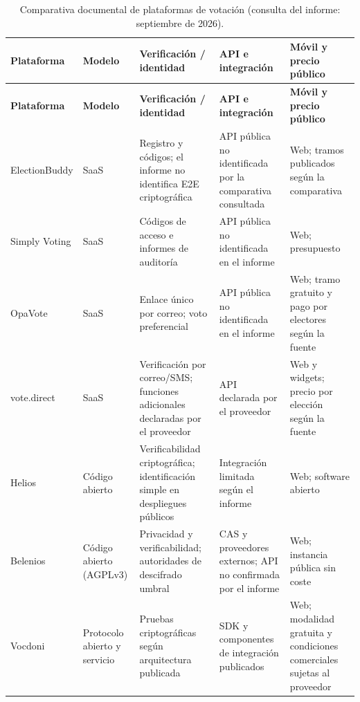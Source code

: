 \small
\setlength{\tabcolsep}{3pt}
\begin{longtable}{|p{}|p{}|p{}|p{}|p{}|}
\caption{Comparativa documental de plataformas de votación (consulta del informe: septiembre de 2026).}\label{tab:comparativa-plataformas}\\
\hline
\textbf{Plataforma} & \textbf{Modelo} & \textbf{Verificación / identidad} & \textbf{API e integración} & \textbf{Móvil y precio público} \\
\hline
\endfirsthead
\hline
\textbf{Plataforma} & \textbf{Modelo} & \textbf{Verificación / identidad} & \textbf{API e integración} & \textbf{Móvil y precio público} \\
\hline
\endhead
\hline
\endfoot
\hline
\endlastfoot
ElectionBuddy \citep{electionbuddy2026} & SaaS & Registro y códigos; el informe no identifica E2E criptográfica & API pública no identificada por la comparativa consultada & Web; tramos publicados según la comparativa \\
\hline
Simply Voting \citep{simplyvoting2026} & SaaS & Códigos de acceso e informes de auditoría & API pública no identificada en el informe & Web; presupuesto \\
\hline
OpaVote \citep{opavote2026} & SaaS & Enlace único por correo; voto preferencial & API pública no identificada en el informe & Web; tramo gratuito y pago por electores según la fuente \\
\hline
vote.direct \citep{votedirect2026comparativa} & SaaS & Verificación por correo/SMS; funciones adicionales declaradas por el proveedor & API declarada por el proveedor & Web y widgets; precio por elección según la fuente \\
\hline
Helios \citep{adida2008helios,helios2026} & Código abierto & Verificabilidad criptográfica; identificación simple en despliegues públicos & Integración limitada según el informe & Web; software abierto \\
\hline
Belenios \citep{cortier2019belenios,belenios2026,inria2018pesto} & Código abierto (AGPLv3) & Privacidad y verificabilidad; autoridades de descifrado umbral & CAS y proveedores externos; API no confirmada por el informe & Web; instancia pública sin coste \\
\hline
Vocdoni \citep{vocdoni2026docs,vocdoni2026sdk,vocdoniintegratorsdk2026} & Protocolo abierto y servicio & Pruebas criptográficas según arquitectura publicada & SDK y componentes de integración publicados & Web; modalidad gratuita y condiciones comerciales sujetas al proveedor \\

\end{longtable}
